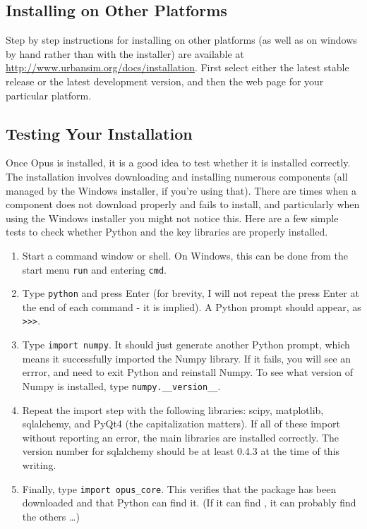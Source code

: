 \subsection{Installing on Other Platforms}

Step by step instructions for installing on other platforms (as well as on
windows by hand rather than with the installer) are available at
\url{http://www.urbansim.org/docs/installation}.  First select either the
latest stable release or the latest development version, and then the web
page for your particular platform.

\subsection{Testing Your Installation}
\label{appendix:testing-your-installation}

Once Opus is installed, it is a good idea to test whether it is installed
correctly.  The installation involves downloading and installing numerous
components (all managed by the Windows installer, if you're using that).
There are times when a component does not download properly and fails to
install, and particularly when using the Windows installer you might not
notice this.  Here are a few simple tests to check whether Python and the
key libraries are properly installed.

\begin{enumerate}
\item Start a command window or shell.  On Windows, this can be done from
  the start menu \verb#run# and entering \verb#cmd#.
\item Type \verb#python# and press Enter (for brevity, I will not repeat
  the press Enter at the end of each command - it is implied).  A Python
  prompt should appear, as \verb#>>>#.
\item Type \verb#import numpy#.  It should just generate another Python
  prompt, which means it successfully imported the Numpy library.  If it
  fails, you will see an errror, and need to exit Python and reinstall
  Numpy.  To see what version of Numpy is installed, type
  \verb#numpy.__version__#.
\item Repeat the import step with the following libraries: scipy,
  matplotlib, sqlalchemy, and PyQt4 (the capitalization matters).  If all
  of these import without reporting an error, the main libraries are
  installed correctly.  The version number for sqlalchemy should be at
  least 0.4.3 at the time of this writing.
\item Finally, type \verb#import opus_core#.  This verifies that the
   package has been downloaded and that Python can find
  it.  (If it can find , it can probably find the others
  \ldots) 
\end{enumerate}

